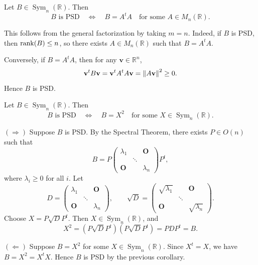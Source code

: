 \begin{corollary}
Let $B\in \operatorname{Sym}_n(\mathbb{R})$. Then
\[
    B\text{ is PSD}
    \quad\Longleftrightarrow\quad
    B=A^tA
    \quad\text{for some }A\in M_n(\mathbb{R}).
\]
\end{corollary}

\begin{pfbox}
This follows from the general factorization by taking $m=n$. Indeed, if $B$ is
PSD, then $\operatorname{rank}(B)\le n$, so there exists $A\in M_n(\mathbb{R})$ such that
$B=A^tA$.

Conversely, if $B=A^tA$, then for any $\mathbf{v}\in\mathbb{R}^n$,
\[
    \mathbf{v}^tB\mathbf{v}
    =
    \mathbf{v}^tA^tA\mathbf{v}
    =
    \left\lVert A\mathbf{v} \right\rVert^2
    \ge 0.
\]
Hence $B$ is PSD.
\end{pfbox}


\begin{corollary}
Let $B\in \operatorname{Sym}_n(\mathbb{R})$. Then
\[
    B\text{ is PSD}
    \quad\Longleftrightarrow\quad
    B=X^2
    \quad\text{for some }X\in \operatorname{Sym}_n(\mathbb{R}).
\]
\end{corollary}

\begin{pfbox}
$(\Rightarrow)$ Suppose $B$ is PSD. By the Spectral Theorem, there exists
$P\in O(n)$ such that
\[
    B
    =
    P
    \begin{pmatrix}
        \lambda_1 &        & \mathbf{O} \\
                  & \ddots &             \\
        \mathbf{O}&        & \lambda_n
    \end{pmatrix}
    P^t,
\]
where $\lambda_i\ge 0$ for all $i$. Let
\[
    D
    =
    \begin{pmatrix}
        \lambda_1 &        & \mathbf{O} \\
                  & \ddots &             \\
        \mathbf{O}&        & \lambda_n
    \end{pmatrix},
    \qquad
    \sqrt{D}
    =
    \begin{pmatrix}
        \sqrt{\lambda_1} &        & \mathbf{O} \\
                         & \ddots &             \\
        \mathbf{O}       &        & \sqrt{\lambda_n}
    \end{pmatrix}.
\]
Choose $X=P\sqrt{D}P^t$. Then $X\in \operatorname{Sym}_n(\mathbb{R})$, and
\[
    X^2
    =
    (P\sqrt{D}P^t)(P\sqrt{D}P^t)
    =
    PD P^t
    =
    B.
\]

\medskip

$(\Leftarrow)$ Suppose $B=X^2$ for some $X\in \operatorname{Sym}_n(\mathbb{R})$.
Since $X^t=X$, we have $B=X^2=X^tX$. Hence $B$ is PSD by the previous
corollary.
\end{pfbox}



